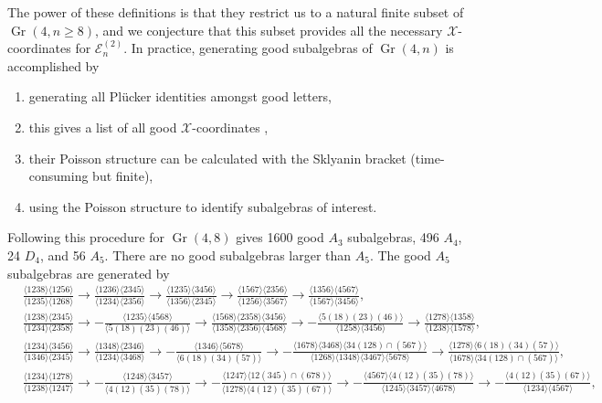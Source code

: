 \documentclass[11pt]{article}
\DeclareMathOperator{\Gr}{Gr}
\def\nl{\nonumber\\}
\def\xcoords{$\mathcal{X}$-coordinates }
\begin{document}
The power of these definitions is that they restrict us to a natural finite subset of $\Gr(4,n\ge8)$, and we conjecture that this subset provides all the necessary \xcoords for $\mathcal{E}^{(2)}_n$. In practice, generating good subalgebras of $\Gr(4,n)$ is accomplished by 
\begin{enumerate}
	\item generating all Pl\"ucker identities amongst good letters,
	\item this gives a list of all good \xcoords,
	\item their Poisson structure can be calculated with the Sklyanin bracket (time-consuming but finite),
	\item using the Poisson structure to identify subalgebras of interest.
\end{enumerate}
Following this procedure for $\Gr(4,8)$ gives 1600 good $A_3$ subalgebras, 496 $A_4$, 24 $D_4$, and 56 $A_5$. There are no good subalgebras larger than $A_5$. The good $A_5$ subalgebras are generated by
\begin{align}\label{eq:g48-a5s}
	&\frac{\langle 1238\rangle  \langle 1256\rangle }{\langle
   1235\rangle  \langle 1268\rangle }\to \frac{\langle
   1236\rangle  \langle 2345\rangle }{\langle 1234\rangle
    \langle 2356\rangle }\to \frac{\langle 1235\rangle 
   \langle 3456\rangle }{\langle 1356\rangle  \langle
   2345\rangle }\to \frac{\langle 1567\rangle  \langle
   2356\rangle }{\langle 1256\rangle  \langle 3567\rangle
   }\to \frac{\langle 1356\rangle  \langle 4567\rangle
   }{\langle 1567\rangle  \langle 3456\rangle },\nl
   &\frac{\langle 1238\rangle  \langle 2345\rangle
   }{\langle 1234\rangle  \langle 2358\rangle
   }\to-\frac{\langle 1235\rangle  \langle 4568\rangle
   }{\langle 5(18)(23)(46)\rangle }\to\frac{\langle
   1568\rangle  \langle 2358\rangle  \langle 3456\rangle
   }{\langle 1358\rangle  \langle 2356\rangle  \langle
   4568\rangle }\to-\frac{\langle 5(18)(23)(46)\rangle
   }{\langle 1258\rangle  \langle 3456\rangle
   }\to\frac{\langle 1278\rangle  \langle 1358\rangle
   }{\langle 1238\rangle  \langle 1578\rangle },\nl
   &\frac{\langle 1234\rangle  \langle 3456\rangle
   }{\langle 1346\rangle  \langle 2345\rangle
   }\to\frac{\langle 1348\rangle  \langle 2346\rangle
   }{\langle 1234\rangle  \langle 3468\rangle
   }\to-\frac{\langle 1346\rangle  \langle 5678\rangle
   }{\langle 6(18)(34)(57)\rangle }\to-\frac{\langle
   1678\rangle  \langle 3468\rangle  \langle 34(128)\cap
   (567)\rangle }{\langle 1268\rangle  \langle
   1348\rangle  \langle 3467\rangle  \langle 5678\rangle
   }\to\frac{\langle 1278\rangle  \langle
   6(18)(34)(57)\rangle }{\langle 1678\rangle  \langle
   34(128)\cap (567)\rangle },\nl
   &\frac{\langle 1234\rangle  \langle 1278\rangle
   }{\langle 1238\rangle  \langle 1247\rangle
   }\to-\frac{\langle 1248\rangle  \langle 3457\rangle
   }{\langle 4(12)(35)(78)\rangle }\to-\frac{\langle
   1247\rangle  \langle 12(345)\cap (678)\rangle
   }{\langle 1278\rangle  \langle 4(12)(35)(67)\rangle
   }\to-\frac{\langle 4567\rangle  \langle
   4(12)(35)(78)\rangle }{\langle 1245\rangle  \langle
   3457\rangle  \langle 4678\rangle }\to-\frac{\langle
   4(12)(35)(67)\rangle }{\langle 1234\rangle  \langle
   4567\rangle },
\end{align}
\end{document}
